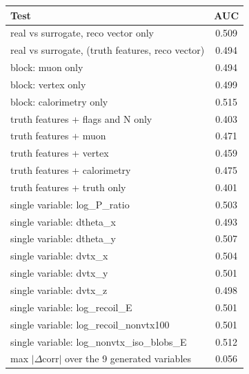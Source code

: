 \begin{tabular}{lc}
\toprule
Test & AUC \\
\midrule
real vs surrogate, reco vector only & 0.509 \\
real vs surrogate, (truth features, reco vector) & 0.494 \\
\midrule
block: muon only & 0.494 \\
block: vertex only & 0.499 \\
block: calorimetry only & 0.515 \\
truth features + flags and N only & 0.403 \\
truth features + muon & 0.471 \\
truth features + vertex & 0.459 \\
truth features + calorimetry & 0.475 \\
truth features + truth only & 0.401 \\
single variable: log\_P\_ratio & 0.503 \\
single variable: dtheta\_x & 0.493 \\
single variable: dtheta\_y & 0.507 \\
single variable: dvtx\_x & 0.504 \\
single variable: dvtx\_y & 0.501 \\
single variable: dvtx\_z & 0.498 \\
single variable: log\_recoil\_E & 0.501 \\
single variable: log\_recoil\_nonvtx100 & 0.501 \\
single variable: log\_nonvtx\_iso\_blobs\_E & 0.512 \\
\midrule
max $|\Delta$corr$|$ over the 9 generated variables & 0.056 \\
\bottomrule
\end{tabular}
